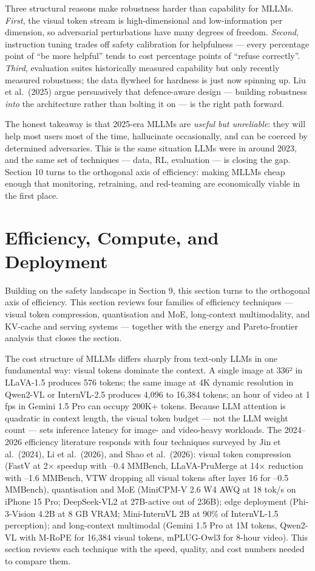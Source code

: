Three structural reasons make robustness harder than capability for MLLMs. \emph{First}, the visual token stream is high-dimensional and low-information per dimension, so adversarial perturbations have many degrees of freedom. \emph{Second}, instruction tuning trades off safety calibration for helpfulness --- every percentage point of ``be more helpful'' tends to cost percentage points of ``refuse correctly''. \emph{Third}, evaluation suites historically measured capability but only recently measured robustness; the data flywheel for hardness is just now spinning up. Liu et al.~(2025) argue persuasively that defence-aware design --- building robustness \emph{into} the architecture rather than bolting it on --- is the right path forward.

The honest takeaway is that 2025-era MLLMs are \emph{useful but unreliable}: they will help most users most of the time, hallucinate occasionally, and can be coerced by determined adversaries. This is the same situation LLMs were in around 2023, and the same set of techniques --- data, RL, evaluation --- is closing the gap. Section 10 turns to the orthogonal axis of efficiency: making MLLMs cheap enough that monitoring, retraining, and red-teaming are economically viable in the first place.

\section{Efficiency, Compute, and Deployment}\label{efficiency-compute-and-deployment}

Building on the safety landscape in Section 9, this section turns to the orthogonal axis of efficiency. This section reviews four families of efficiency techniques --- visual token compression, quantisation and MoE, long-context multimodality, and KV-cache and serving systems --- together with the energy and Pareto-frontier analysis that closes the section.

The cost structure of MLLMs differs sharply from text-only LLMs in one fundamental way: visual tokens dominate the context. A single image at 336² in LLaVA-1.5 produces 576 tokens; the same image at 4K dynamic resolution in Qwen2-VL or InternVL-2.5 produces 4,096 to 16,384 tokens; an hour of video at 1 fps in Gemini 1.5 Pro can occupy 200K+ tokens. Because LLM attention is quadratic in context length, the visual token budget --- not the LLM weight count --- sets inference latency for image- and video-heavy workloads. The 2024--2026 efficiency literature responds with four techniques surveyed by Jin et al.~(2024), Li et al.~(2026), and Shao et al.~(2026): visual token compression (FastV at 2× speedup with --0.4 MMBench, LLaVA-PruMerge at 14× reduction with --1.6 MMBench, VTW dropping all visual tokens after layer 16 for --0.5 MMBench), quantisation and MoE (MiniCPM-V 2.6 W4 AWQ at 18 tok/s on iPhone 15 Pro; DeepSeek-VL2 at 27B-active out of 236B); edge deployment (Phi-3-Vision 4.2B at 8 GB VRAM; Mini-InternVL 2B at 90\% of InternVL-1.5 perception); and long-context multimodal (Gemini 1.5 Pro at 1M tokens, Qwen2-VL with M-RoPE for 16,384 visual tokens, mPLUG-Owl3 for 8-hour video). This section reviews each technique with the speed, quality, and cost numbers needed to compare them.

